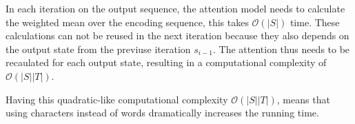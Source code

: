 In each iteration on the output sequence, the attention model needs to calculate the weighted mean over the encoding sequence, this takes $\mathcal{O}(|S|)$ time. These calculations can not be reused in the next iteration because they also depends on the output state from the previuse iteration $s_{i-1}$. The attention thus needs to be recaulated for each output state, resulting in a computational complexity of $\mathcal{O}(|S||T|)$.

Having this quadratic-like computational complexity $\mathcal{O}(|S||T|)$, means that using characters instead of words dramatically increases the running time.

